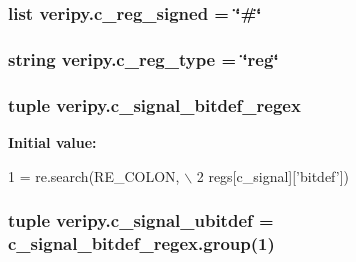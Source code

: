 \hypertarget{namespaceveripy_a340fd491db72cef85a27ed7d34825e2f}{
\subsubsection[{c\-\_\-reg\-\_\-signed}]{\setlength{\rightskip}{0pt plus 5cm}list veripy.\-c\-\_\-reg\-\_\-signed = \char`\"{}\#\char`\"{}}}\label{namespaceveripy_a340fd491db72cef85a27ed7d34825e2f}
\hypertarget{namespaceveripy_a28beb86ef22e1797f2a263e0b7bde37e}{
\subsubsection[{c\-\_\-reg\-\_\-type}]{\setlength{\rightskip}{0pt plus 5cm}string veripy.\-c\-\_\-reg\-\_\-type = \char`\"{}reg\char`\"{}}}\label{namespaceveripy_a28beb86ef22e1797f2a263e0b7bde37e}
\hypertarget{namespaceveripy_a236b47105aebf9535a23f5e3584fc8d5}{
\subsubsection[{c\-\_\-signal\-\_\-bitdef\-\_\-regex}]{\setlength{\rightskip}{0pt plus 5cm}tuple veripy.\-c\-\_\-signal\-\_\-bitdef\-\_\-regex}}\label{namespaceveripy_a236b47105aebf9535a23f5e3584fc8d5}
{\bfseries Initial value\-:}
\begin{DoxyCode}
1 = re.search(RE\_COLON, \(\backslash\)
2                                                 regs[c\_signal][\textcolor{stringliteral}{'bitdef'}])
\end{DoxyCode}
\hypertarget{namespaceveripy_aed3cb62c9f8ae9fa7f95a39dd184db5b}{
\subsubsection[{c\-\_\-signal\-\_\-ubitdef}]{\setlength{\rightskip}{0pt plus 5cm}tuple veripy.\-c\-\_\-signal\-\_\-ubitdef = c\-\_\-signal\-\_\-bitdef\-\_\-regex.\-group(1)}}\label{namespaceveripy_aed3cb62c9f8ae9fa7f95a39dd184db5b}
